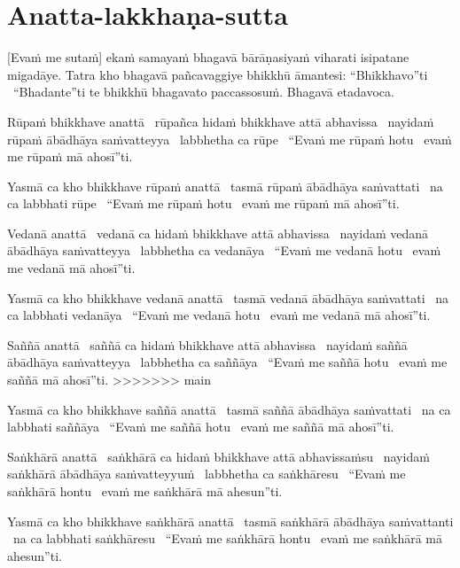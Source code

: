 \section{Anatta-lakkhaṇa-sutta}
\label{anatta-lakkhana}

[Evaṁ me sutaṁ] ekaṁ samayaṁ bhagavā bārāṇasiyaṁ viharati isipatane migadāye. Tatra kho bhagavā pañcavaggiye bhikkhū āmantesi: “Bhikkhavo”ti \breathmark\ “Bhadante”ti te bhikkhū bhagavato paccassosuṁ. Bhagavā etadavoca.


Rūpaṁ bhikkhave anattā \breathmark\ rūpañca hidaṁ bhikkhave attā abhavissa \breathmark\ nayidaṁ rūpaṁ ābādhāya saṁvatteyya \breathmark\ labbhetha ca rūpe \breathmark\ “Evaṁ me rūpaṁ hotu \breathmark\ evaṁ me rūpaṁ mā ahosī”ti.

Yasmā ca kho bhikkhave rūpaṁ anattā \breathmark\ tasmā rūpaṁ ābādhāya saṁvattati \breathmark\ na ca labbhati rūpe \breathmark\ “Evaṁ me rūpaṁ hotu \breathmark\ evaṁ me rūpaṁ mā ahosī”ti.

Vedanā anattā \breathmark\ vedanā ca hidaṁ bhikkhave attā abhavissa \breathmark\ nayidaṁ vedanā ābādhāya saṁvatteyya \breathmark\ labbhetha ca vedanāya \breathmark\ “Evaṁ me vedanā hotu \breathmark\ evaṁ me vedanā mā ahosī”ti.

Yasmā ca kho bhikkhave vedanā anattā \breathmark\ tasmā vedanā ābādhāya saṁvattati \breathmark\ na ca labbhati vedanāya \breathmark\ “Evaṁ me vedanā hotu \breathmark\ evaṁ me vedanā mā ahosī”ti.

Saññā anattā \breathmark\ saññā ca hidaṁ bhikkhave attā abhavissa \breathmark\ nayidaṁ saññā ābādhāya saṁvatteyya \breathmark\ labbhetha ca saññāya \breathmark\ “Evaṁ me saññā hotu \breathmark\ evaṁ me saññā mā ahosī”ti.
>>>>>>> main

Yasmā ca kho bhikkhave saññā anattā \breathmark\ tasmā saññā ābādhāya saṁvattati \breathmark\ na ca labbhati saññāya \breathmark\ “Evaṁ me saññā hotu \breathmark\ evaṁ me saññā mā ahosī”ti.

Saṅkhārā anattā \breathmark\ saṅkhārā ca hidaṁ bhikkhave attā abhavissaṁsu \breathmark\ nayidaṁ saṅkhārā ābādhāya saṁvatteyyuṁ \breathmark\ labbhetha ca saṅkhāresu \breathmark\ “Evaṁ me saṅkhārā hontu \breathmark\ evaṁ me saṅkhārā mā ahesun”ti.

Yasmā ca kho bhikkhave saṅkhārā anattā \breathmark\ tasmā saṅkhārā ābādhāya saṁvattanti \breathmark\ na ca labbhati saṅkhāresu \breathmark\ “Evaṁ me saṅkhārā hontu \breathmark\ evaṁ me saṅkhārā mā ahesun”ti.

